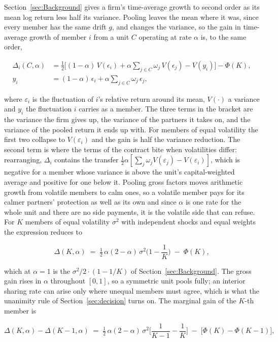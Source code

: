 \documentclass[12pt,a4paper]{article}
\begin{document}
Section~\ref{sec:Background} gives a firm's time-average growth to second order as its mean log return less half its variance. Pooling leaves the mean where it was, since every member has the same drift $g$, and changes the variance, so the gain in time-average growth of member $i$ from a unit $C$ operating at rate $\alpha$ is, to the same order,

\begin{align*}
\Delta_i(C,\alpha) &= \tfrac12\Big[(1-\alpha)\,V(\epsilon_i) + \alpha\sum_{j\in C}\omega_j\,V(\epsilon_j) - V(y_i)\Big] - \Phi(K), \\
y_i &= (1-\alpha)\,\epsilon_i + \alpha\sum_{j\in C}\omega_j\,\epsilon_j ,
\end{align*}

where $\varepsilon_i$ is the fluctuation of $i$'s relative return around its mean, $V(\cdot)$ a variance and $y_i$ the fluctuation $i$ carries as a member. The three terms in the bracket are the variance the firm gives up, the variance of the partners it takes on, and the variance of the pooled return it ends up with. For members of equal volatility the first two collapse to $V(\varepsilon_i)$ and the gain is half the variance reduction. The second term is where the terms of the contract bite when volatilities differ: rearranging, $\Delta_i$ contains the transfer $\tfrac12 \alpha [\sum_j \omega_j V(\varepsilon_j) - V(\varepsilon_i)]$, which is negative for a member whose variance is above the unit's capital-weighted average and positive for one below it. Pooling gross factors moves arithmetic growth from volatile members to calm ones, so a volatile member pays for its calmer partners' protection as well as its own and since $\alpha$ is one rate for the whole unit and there are no side payments, it is the volatile side that can refuse. For $K$ members of equal volatility $\sigma^2$ with independent shocks and equal weights the expression reduces to

$$\Delta(K,\alpha) \;=\; \tfrac12\,\alpha(2-\alpha)\,\sigma^2\Big(1-\frac1K\Big) \;-\; \Phi(K),$$

which at $\alpha = 1$ is the $\sigma^2/2 \cdot (1 - 1/K)$ of Section~\ref{sec:Background}. The gross gain rises in $\alpha$ throughout $[0, 1]$, so a symmetric unit pools fully; an interior sharing rate can arise only where unequal members must agree, which is what the unanimity rule of Section~\ref{sec:decision} turns on. The marginal gain of the $K$-th member is

$$\Delta(K,\alpha)-\Delta(K-1,\alpha) \;=\; \tfrac12\,\alpha(2-\alpha)\,\sigma^2\Big[\frac{1}{K-1}-\frac{1}{K}\Big] \;-\; \big[\Phi(K)-\Phi(K-1)\big],$$
\end{document}
